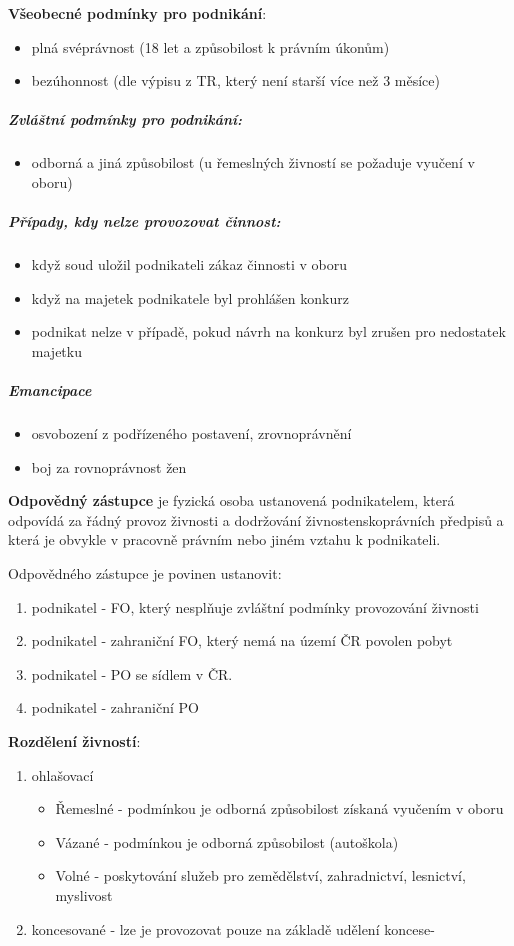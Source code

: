 \textbf{Všeobecné podmínky pro podnikání}:
\begin{itemize}
    \item plná svéprávnost (18 let a způsobilost k právním úkonům)
    \item bezúhonnost (dle výpisu z TR, který není starší více než 3 měsíce)
\end{itemize}

\subparagraph{Zvláštní podmínky pro podnikání:}
\begin{itemize}
    \item odborná a jiná způsobilost (u řemeslných živností se požaduje vyučení v oboru)
\end{itemize}

\subparagraph{Případy, kdy nelze provozovat činnost:}
\begin{itemize}
    \item když soud uložil podnikateli zákaz činnosti v oboru
    \item když na majetek podnikatele byl prohlášen konkurz
    \item podnikat nelze v případě, pokud návrh na konkurz byl zrušen pro nedostatek majetku
\end{itemize}

\subparagraph{Emancipace}
\begin{itemize}
    \item osvobození z podřízeného postavení, zrovnoprávnění
    \item boj za rovnoprávnost žen
\end{itemize}

\textbf{Odpovědný zástupce} je fyzická osoba ustanovená podnikatelem, která odpovídá za řádný provoz živnosti a dodržování živnostenskoprávních předpisů a která je obvykle v pracovně právním nebo jiném vztahu k podnikateli.

Odpovědného zástupce je povinen ustanovit:
\begin{enumerate}
    \item podnikatel - FO, který nesplňuje zvláštní podmínky provozování živnosti
    \item podnikatel - zahraniční FO, který nemá na území ČR povolen pobyt
    \item podnikatel - PO se sídlem v ČR.
    \item podnikatel - zahraniční PO
\end{enumerate}

\textbf{Rozdělení živností}:
\begin{enumerate}
    \item ohlašovací
        \begin{itemize}
            \item Řemeslné - podmínkou je odborná způsobilost získaná vyučením v oboru
            \item Vázané - podmínkou je odborná způsobilost (autoškola)
            \item Volné - poskytování služeb pro zemědělství, zahradnictví, lesnictví, myslivost
        \end{itemize}				
    \item koncesované - lze je provozovat pouze na základě udělení koncese-
\end{enumerate}	


